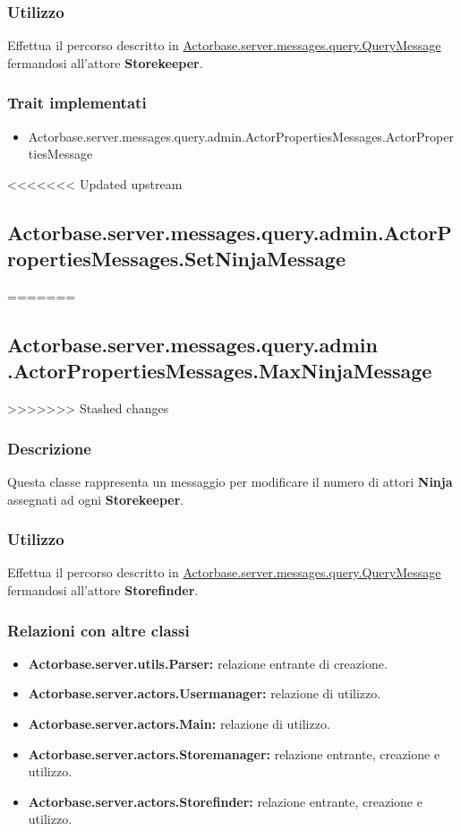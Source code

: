 \documentclass[a4paper]{article}
\begin{document}
			\subsubsection{Utilizzo}
				Effettua il percorso descritto in \hyperref[QueryMessage]{Actorbase.server.messages.query.QueryMessage} fermandosi all'attore 
				\textbf{Storekeeper}.
				
			\subsubsection{Trait implementati}
				\begin{itemize}
					\item Actorbase.server.messages.query.admin.ActorPropertiesMessages.ActorPropertiesMessage
				\end{itemize}
		
<<<<<<< Updated upstream
		\subsection{Actorbase.server.messages.query.admin.ActorPropertiesMessages.SetNinjaMessage}
=======
		\subsection{Actorbase.server.messages.query.admin \newline
		.ActorPropertiesMessages.MaxNinjaMessage}
>>>>>>> Stashed changes
			\subsubsection{Descrizione}
				Questa classe rappresenta un messaggio per modificare il numero di attori \textbf{Ninja} assegnati ad ogni \textbf{Storekeeper}.
				
			\subsubsection{Utilizzo}
				Effettua il percorso descritto in \hyperref[QueryMessage]{Actorbase.server.messages.query.QueryMessage} fermandosi all'attore 
				\textbf{Storefinder}.
				
			\subsubsection{Relazioni con altre classi}
				\begin{itemize}
					\item \textbf{Actorbase.server.utils.Parser:} relazione entrante di creazione.
					\item \textbf{Actorbase.server.actors.Usermanager:} relazione di utilizzo.
					\item \textbf{Actorbase.server.actors.Main:} relazione di utilizzo.
					\item \textbf{Actorbase.server.actors.Storemanager:} relazione entrante, creazione e utilizzo.
					\item \textbf{Actorbase.server.actors.Storefinder:} relazione entrante, creazione e utilizzo.
				\end{itemize}
\end{document}
